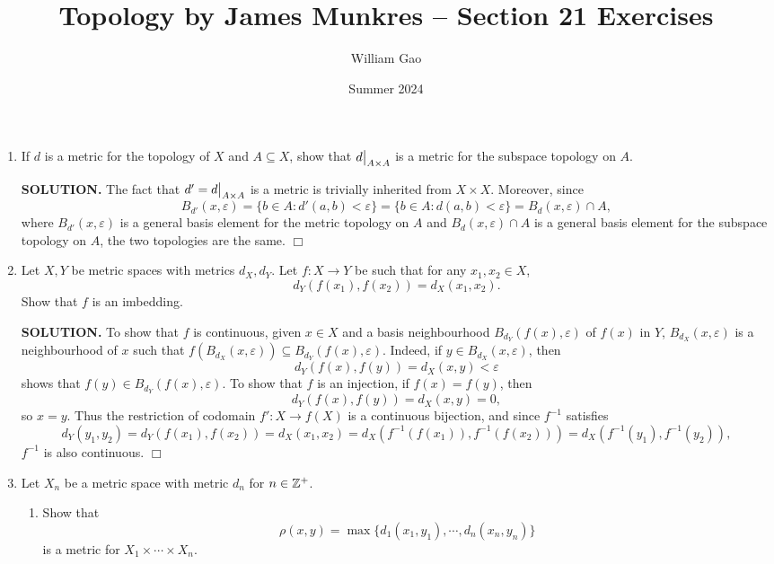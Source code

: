 \documentclass{article}
\title{Topology by James Munkres -- Section 21 Exercises}
\author{William Gao}
\date{Summer 2024}
\begin{document}
\maketitle

\begin{enumerate}
    \item If $d$ is a metric for the topology of $X$ and $A \subseteq X$, show that $\restr{d}{A \times A}$ is a metric for the subspace topology on $A$.

    {\bf SOLUTION.} The fact that $d' = \restr{d}{A \times A}$ is a metric is trivially inherited from $X \times X$. Moreover, since
    $$B_{d'}(x, \varepsilon) = \{b \in A: d'(a, b) < \varepsilon\} = \{b \in A: d(a, b) < \varepsilon\} = B_d(x, \varepsilon) \cap A,$$
    where $B_{d'}(x, \varepsilon)$ is a general basis element for the metric topology on $A$ and $ B_d(x, \varepsilon) \cap A$ is a general basis element for the subspace topology on $A$, the two topologies are the same. $\Box$

    \item Let $X, Y$ be metric spaces with metrics $d_X, d_Y$. Let $f: X\rightarrow Y$ be such that for any $x_1, x_2 \in X$,
    $$d_Y(f(x_1), f(x_2)) = d_X(x_1, x_2).$$
    Show that $f$ is an imbedding.
    
    {\bf SOLUTION.} To show that $f$ is continuous, given $x \in X$ and a basis neighbourhood $B_{d_Y}(f(x), \varepsilon)$ of $f(x)$ in $Y$, $B_{d_X}(x, \varepsilon)$ is a neighbourhood of $x$ such that $f(B_{d_X}(x, \varepsilon)) \subseteq B_{d_Y}(f(x), \varepsilon)$. Indeed, if $y \in B_{d_X}(x, \varepsilon)$, then
    $$d_Y(f(x), f(y)) = d_X(x, y) < \varepsilon$$
    shows that $f(y) \in B_{d_Y}(f(x), \varepsilon)$. To show that $f$ is an injection, if $f(x) = f(y)$, then
    $$d_Y(f(x), f(y)) = d_X(x, y) = 0,$$
    so $x = y$. Thus the restriction of codomain $f': X \rightarrow f(X)$ is a continuous bijection, and since $f^{-1}$ satisfies
    $$d_Y(y_1, y_2) = d_Y(f(x_1), f(x_2)) = d_X(x_1, x_2) = d_X(f^{-1}(f(x_1)), f^{-1}(f(x_2))) = d_X(f^{-1}(y_1), f^{-1}(y_2)),$$
    $f^{-1}$ is also continuous. $\Box$

    \item Let $X_n$ be a metric space with metric $d_n$ for $n \in \mathbb{Z}^+$.
    \begin{enumerate}
        \item Show that
        $$\rho(x, y) = \max \{d_1(x_1,y_1), \cdots, d_n(x_n, y_n)\}$$
        is a metric for $X_1 \times \cdots \times X_n$.


\end{enumerate}
\end{enumerate}
\end{document}

